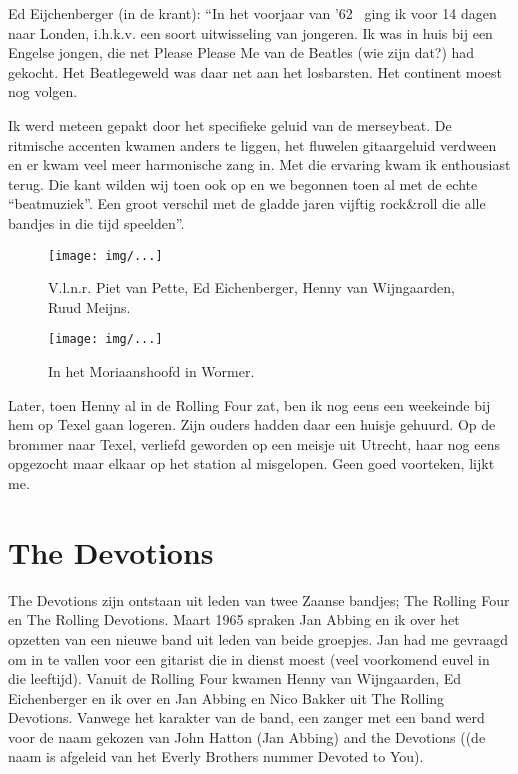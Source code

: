 \documentclass[10pt,twoside,openright]{memoir}
\begin{document}
Ed Eijchenberger (in de krant): “In het voorjaar van ’62  ging ik voor 14 dagen naar Londen, i.h.k.v. een soort uitwisseling van jongeren. Ik was in huis bij een Engelse jongen, die net Please Please Me van de Beatles (wie zijn dat?) had gekocht. Het Beatlegeweld was daar net aan het losbarsten. Het continent moest nog volgen. 

Ik werd meteen gepakt door het specifieke geluid van de merseybeat. De ritmische accenten kwamen anders te liggen, het fluwelen gitaargeluid verdween en er kwam veel meer harmonische zang in. Met die ervaring kwam ik enthousiast terug. Die kant wilden wij toen ook op en we begonnen toen al met de echte “beatmuziek”. Een groot verschil met de gladde jaren vijftig rock&roll die alle bandjes in die tijd speelden”.

\begin{figure}[t]
\texttt{[image: img/...]}
\caption{V.l.n.r. Piet van Pette, Ed Eichenberger, Henny van Wijngaarden, Ruud Meijns.}
\end{figure}
 
\begin{figure}[t]
\texttt{[image: img/...]}
\caption{In het Moriaanshoofd in Wormer.}
\end{figure}

Later, toen Henny al in de Rolling Four zat, ben ik nog eens een weekeinde bij hem op Texel gaan logeren. Zijn ouders hadden daar een huisje gehuurd. Op de brommer naar Texel, verliefd geworden op een meisje uit Utrecht, haar nog eens opgezocht maar elkaar op het station al misgelopen. Geen goed voorteken, lijkt me.

\chapter{The Devotions} %
\label{cha:devotions}

The Devotions zijn ontstaan uit leden van twee Zaanse bandjes; The Rolling Four en The Rolling Devotions. Maart 1965 spraken Jan Abbing en ik over het opzetten van een nieuwe band uit leden van beide groepjes. Jan had me gevraagd om in te vallen voor een gitarist die in dienst moest (veel voorkomend euvel in die leeftijd). Vanuit de Rolling Four kwamen Henny van Wijngaarden, Ed Eichenberger en ik over en Jan Abbing en Nico Bakker uit The Rolling Devotions. Vanwege het karakter van de band, een zanger met een band werd voor de naam gekozen van John Hatton (Jan Abbing) and the Devotions ((de naam is afgeleid van het Everly Brothers nummer Devoted to You).
\end{document}
